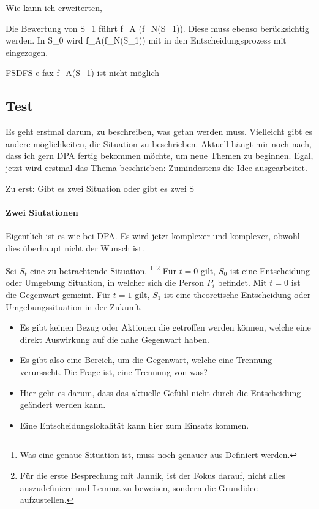 Wie kann ich erweiterten, 

Die Bewertung von S_1 führt f_A (f_N(S_1)). Diese muss ebenso berücksichtig werden. In S_0 wird f_A(f_N(S_1)) mit in den Entscheidungsprozess mit eingezogen. 

FSDFS e-fax f_A(S_1) ist nicht möglich 

\subsection{Test}
Es geht erstmal darum, zu beschreiben, was getan werden muss.
Vielleicht gibt es andere möglichkeiten, die Situation zu beschrieben.
Aktuell hängt mir noch nach, dass ich gern DPA fertig bekommen möchte, um neue Themen zu beginnen.
Egal, jetzt wird erstmal das Thema beschrieben: Zumindestens die Idee ausgearbeitet.

Zu erst: Gibt es zwei Situation oder gibt es zwei S

\paragraph{Zwei Siutationen} Eigentlich ist es wie bei DPA. Es wird jetzt komplexer und komplexer, obwohl dies überhaupt nicht der Wunsch ist.

Sei $S_t$ eine zu betrachtende Situation.
\footnote{
	Was eine genaue Situation ist, muss noch genauer aus Definiert werden.
}
\footnote{
	Für die erste Besprechung mit Jannik, ist der Fokus darauf, nicht alles auszudefiniere und Lemma zu beweisen, sondern die Grundidee aufzustellen.
}
Für $t=0$ gilt, $S_0$ ist eine Entscheidung oder Umgebung Situation, in welcher sich die Person $P_i$ befindet. 
Mit $t=0$ ist die Gegenwart gemeint. 
Für $t=1$ gilt, $S_1$ ist eine theoretische Entscheidung oder Umgebungssituation in der Zukunft.
\begin{itemize}
	\item Es gibt keinen Bezug oder Aktionen die getroffen werden können, welche eine direkt Auswirkung auf die nahe Gegenwart haben.
	\item Es gibt also eine Bereich, um die Gegenwart, welche eine Trennung verursacht. Die Frage ist, eine Trennung von was?
	\item Hier geht es darum, dass das aktuelle Gefühl nicht durch die Entscheidung geändert werden kann.
	\item Eine Entscheidungslokalität kann hier zum Einsatz kommen.
\end{itemize}